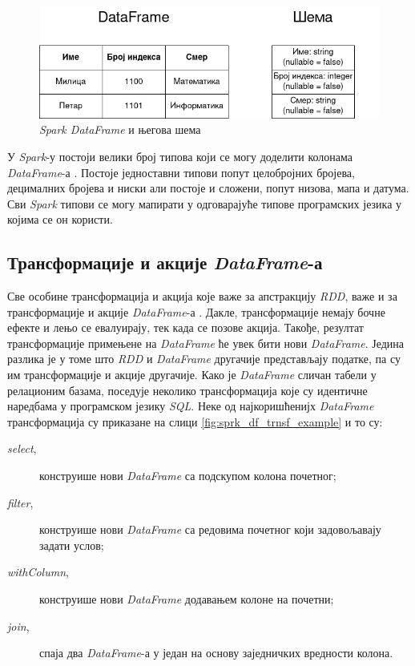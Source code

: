 \documentclass[12pt,oneside]{memoir}
\begin{document}
\begin{figure}[!ht]
  \centering
  \includegraphics[width=1\textwidth]{pictures/dataframe_schema.png}
  \caption{\textit{Spark DataFrame} и његова шема}
  \label{fig:sprk_df_schema_example}
\end{figure}

У \textit{Spark}-у постоји велики број типова који се могу доделити колонама \textit{DataFrame}-а \cite{spark_guide}. Постоје једноставни типови попут целобројних бројева, децималних бројева и ниски али постоје и сложени, попут низова, мапа и датума. Сви \textit{Spark} типови се могу мапирати у одговарајуће типове програмских језика у којима се он користи.

\subsection{Трансформације и акције \textit{DataFrame}-а}
\label{subsec:spark_sql_ac_tr}

Све особине трансформација и акција које важе за апстракцију \textit{RDD}, важе и за трансформације и акције \textit{DataFrame}-а \cite{spark_guide}. Дакле, трансформације немају бочне ефекте и лењо се евалуирају, тек када се позове акција. Такође, резултат трансформације примењене на \textit{DataFrame} ће увек бити нови \textit{DataFrame}. Једина разлика је у томе што \textit{RDD} и \textit{DataFrame} другачије представљају податке, па су им трансформације и акције другачије. Како је \textit{DataFrame} сличан табели у релационим базама, поседује неколико трансформација које су идентичне наредбама у програмском језику \textit{SQL}. Неке од најкоришћенијх \textit{DataFrame} трансформација су приказане на слици \ref{fig:sprk_df_trnsf_example} и то су:

\begin{description} 
	\item[\textit{select},] конструише нови \textit{DataFrame} са подскупом колона почетног;
	\item[\textit{filter},] конструише нови \textit{DataFrame} са редовима почетног који задовољавају задати услов;
	\item[\textit{withColumn},] конструише нови \textit{DataFrame} додавањем колоне на почетни;
		\item[\textit{join},] спаја два \textit{DataFrame}-а у један на основу заједничких вредности колона.
\end{description}
\end{document}

